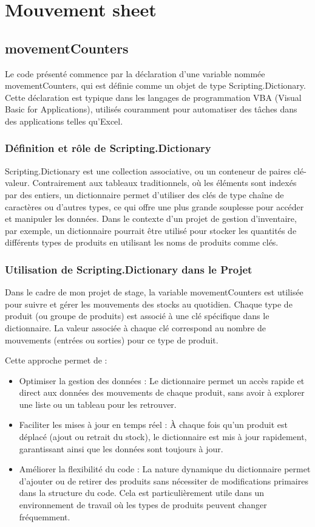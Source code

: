 \documentclass[a4paper, oneside, 12pt, final]{extreport}
\begin{document}
\section{Mouvement sheet}
\subsection{movementCounters}
Le code présenté commence par la déclaration d'une variable nommée movementCounters, qui est définie comme un objet de type Scripting.Dictionary. Cette déclaration est typique dans les langages de programmation VBA (Visual Basic for Applications), utilisés couramment pour automatiser des tâches dans des applications telles qu'Excel.

\subsubsection{Définition et rôle de Scripting.Dictionary}
Scripting.Dictionary est une collection associative, ou un conteneur de paires clé-valeur. Contrairement aux tableaux traditionnels, où les éléments sont indexés par des entiers, un dictionnaire permet d'utiliser des clés de type chaîne de caractères ou d'autres types, ce qui offre une plus grande souplesse pour accéder et manipuler les données. Dans le contexte d'un projet de gestion d'inventaire, par exemple, un dictionnaire pourrait être utilisé pour stocker les quantités de différents types de produits en utilisant les noms de produits comme clés.

\subsubsection{Utilisation de Scripting.Dictionary dans le Projet}
Dans le cadre de mon projet de stage, la variable movementCounters est utilisée pour suivre et gérer les mouvements des stocks au quotidien. Chaque type de produit (ou groupe de produits) est associé à une clé spécifique dans le dictionnaire. La valeur associée à chaque clé correspond au nombre de mouvements (entrées ou sorties) pour ce type de produit.

Cette approche permet de :
\begin{itemize}


\item Optimiser la gestion des données : Le dictionnaire permet un accès rapide et direct aux données des mouvements de chaque produit, sans avoir à explorer une liste ou un tableau pour les retrouver.

\item Faciliter les mises à jour en temps réel : À chaque fois qu'un produit est déplacé (ajout ou retrait du stock), le dictionnaire est mis à jour rapidement, garantissant ainsi que les données sont toujours à jour.

\item Améliorer la flexibilité du code : La nature dynamique du dictionnaire permet d'ajouter ou de retirer des produits sans nécessiter de modifications primaires dans la structure du code. Cela est particulièrement utile dans un environnement de travail où les types de produits peuvent changer fréquemment.
\end{itemize}
\end{document}
